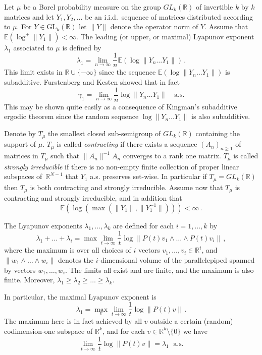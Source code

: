 \documentclass[12pt]{article}
\newcommand{\1}{\mathbf{1}}
\begin{document}
Let $\mu$ be a Borel probability measure on the group $GL_k(\mathbb{R})$ of invertible $k$ by $k$ matrices and let $Y_1, Y_2, \dots$ be an i.i.d.~sequence of matrices distributed according to $\mu$. 
For $Y \in \mathrm{GL}_k(\mathbb{R})$ let $\|Y\|$ denote the operator norm of $Y$. Assume that $\mathbb{E}(\log^{+}\|Y_1\|) < \infty$. The leading (or upper, or maximal) Lyapunov exponent $\lambda_1$ associated to $\mu$ is defined by 
$$
\lambda_1 = \lim_{n \to \infty} \frac{1}{n} \mathbb{E}( \log \|Y_n \dots Y_1\|)\,.
$$
This limit exists in $\mathbb{R} \cup \{-\infty\}$ since the sequence $\mathbb{E}(\log \|Y_n \dots Y_1\|)$ is subadditive.  Furstenberg and Kesten showed that in fact
$$
\gamma_1 = \lim_{n \to \infty} \frac{1}{n}\log\|Y_n \dots Y_1\|\quad\text{a.s.}
$$
This may be shown quite easily as a consequence of Kingman's subadditive ergodic theorem since the random sequence $\log \|Y_n \dots Y_1\|$ is also subadditive.

Denote by $T_\mu$ the smallest closed sub-semigroup of $GL_k(\mathbb{R})$ containing the support of $\mu$. $T_\mu$ is called \emph{contracting} if there exists a sequence $\left(A_n\right)_{n \ge 1}$ of matrices in $T_\mu$ such that $\|A_n\|^{-1} A_n$ converges to a rank one matrix. $T_\mu$ is called \emph{strongly irreducible} if there is no non-empty finite collection of proper linear subspaces of~$\mathbb{R}^{N-1}$ that $Y_1$ a.s. preserves set-wise. In particular if $T_\mu = GL_k(\mathbb{R})$ then $T_\mu$ is both contracting and strongly irreducible. Assume now that $T_\mu$ is contracting and strongly irreducible, and in addition that
$$
\mathbb{E}(\log(\max(\|Y_1\|, \| Y_1^{-1}\|))) < \infty\,.
$$ 

The Lyapunov exponents $\lambda_1, \dots, \lambda_{k}$ are defined for each $i = 1, \dots, k$ by
$$\lambda_1 + \dots + \lambda_i = \max \lim_{t \to \infty} \frac{1}{t}\log\|P(t)v_1 \wedge \dots \wedge P(t)v_i\|\,,$$ where the maximum is over all choices of $i$ vectors $v_1, \dots, v_i \in \mathbb{R}^{i}$, and $\|w_1 \wedge \dots \wedge w_i\|$ denotes the $i$-dimensional volume of the parallelepiped spanned by vectors $w_1, \dots, w_i$. The limits all exist 
 and are finite, and the maximum is also finite.  Moreover, $\lambda_1 \ge \lambda_2 \ge \dots \ge \lambda_k$.
  
In particular, the maximal Lyapunov exponent is
$$
\lambda_1 =  \max_v \lim_{t \to \infty} \frac{1}{t}\log \|P(t)v\|\,.
$$ 
The maximum here is in fact achieved by all $v$ outside a certain (random) codimension-one subspace of $\mathbb{R}^{k}$, and for each $v \in \mathbb{R}^{k} \setminus \{0\}$ we have
$$\lim_{t \to \infty} \frac{1}{t} \log \|P(t)v\|= \lambda_1 \;\text{ a.s.}  $$
\end{document}
